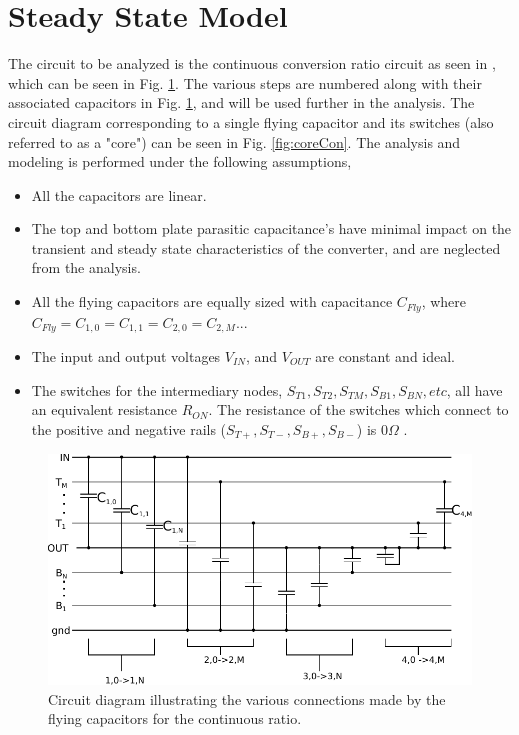 \documentclass[conference]{IEEEtran}
\begin{document}
	\section{Steady State Model}
	The circuit to be analyzed is the continuous conversion ratio circuit as seen in \cite{Butzen2019}, which can be seen in Fig. \ref{fig:contTop}. The various steps are numbered along with their associated capacitors in Fig. \ref{fig:contTop}, and will be used further in the analysis. The circuit diagram corresponding to a single flying capacitor and its switches (also referred to as a "core") can be seen in Fig. \ref{fig:coreCon}. The analysis and modeling is performed under the following assumptions,
	\begin{itemize}
		\item All the capacitors are linear.
		\item The top and bottom plate parasitic capacitance's have minimal impact on the transient and steady state characteristics of the converter, and are neglected from the analysis.
		\item All the flying capacitors are equally sized with capacitance $C_{Fly}$, where $C_{Fly} = C_{1,0} = C_{1,1} = C_{2,0} = C_{2,M} ...$
		\item The input and output voltages $V_{IN}$, and $V_{OUT}$ are constant and ideal.
		\item The switches for the intermediary nodes, $S_{T1}, S_{T2}, S_{TM}, S_{B1}, S_{BN}, etc$, all have an equivalent resistance $R_{ON}$. The resistance of the switches which connect to the positive and negative rails ($S_{T+}, S_{T-}, S_{B+}, S_{B-}$) is 0$\Omega$ .
	\end{itemize}
	\begin{figure}
		\centering
		\includegraphics[width=\linewidth]{Figures/contRatioCircuit2.pdf}
		\caption{Circuit diagram illustrating the various connections made by the flying capacitors for the continuous ratio.}
		\label{fig:contTop}
	\end{figure}
\end{document}
